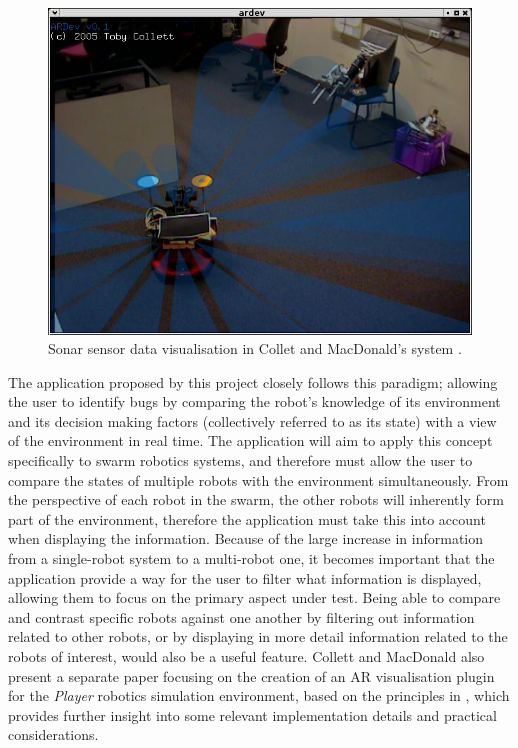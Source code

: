 \documentclass[hidelinks,10pt]{article}
\begin{document}
\begin{figure}[H]
	\begin{center}
	\includegraphics[scale=0.6]{Sonar.png}
	\caption{Sonar sensor data visualisation in Collet and MacDonald's system \cite{AugmentedRealityDebuggingSystem}.}
	\label{fig:Sonar}
	\end{center}
\end{figure}

The application proposed by this project closely follows this paradigm; allowing the user to identify bugs by comparing the robot's knowledge of its environment and its decision making factors (collectively referred to as its state) with a view of the environment in real time. The application will aim to apply this concept specifically to swarm robotics systems, and therefore must allow the user to compare the states of multiple robots with the environment simultaneously. From the perspective of each robot in the swarm, the other robots will inherently form part of the environment, therefore the application must take this into account when displaying the information. Because of the large increase in information from a single-robot system to a multi-robot one, it becomes important that the application provide a way for the user to filter what information is displayed, allowing them to focus on the primary aspect under test. Being able to compare and contrast specific robots against one another by filtering out information related to other robots, or by displaying in more detail information related to the robots of interest, would also be a useful feature. Collett and MacDonald also present a separate paper \cite{ARForPlayer} focusing on the creation of an AR visualisation plugin for the \textit{Player} \cite{Player} robotics simulation environment, based on the principles in  \cite{AugmentedRealityDebuggingSystem}, which provides further insight into some relevant implementation details and practical considerations.
\end{document}
